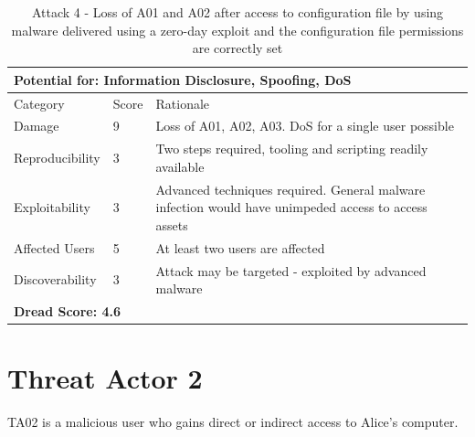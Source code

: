 \documentclass [11pt, proquest] {uwthesis}[2020/02/24]
\begin{document}
\begin{table}[H]
\label{attack4-ref}
\begin{tabular}{|m{3cm}|m{.9cm}|p{27em} |}
\multicolumn{3}{l}{Potential for: Information Disclosure, Spoofing, DoS}                   \\
\hline
Category & Score & Rationale \\
\hline
Damage          & 9     & Loss of A01, A02, A03. DoS for a single user possible            \\
\hline
Reproducibility & 3     & Two steps required, tooling and scripting readily available    \\
\hline
Exploitability & 3      & Advanced techniques required. General malware infection would have unimpeded access to access assets  \\
\hline
Affected Users  & 5     & At least two users are affected                      \\
\hline
Discoverability & 3     & Attack may be targeted - exploited by advanced malware \\
\hline
\multicolumn{3}{l}{\textbf{Dread Score: 4.6}} 
\end{tabular}
\caption{Attack 4 - Loss of A01 and A02 after access to configuration file by using malware delivered using a zero-day exploit and the configuration file permissions are correctly set}
\end{table}

\section{Threat Actor 2}
TA02 is a malicious user who gains direct or indirect access to Alice's computer.  
\end{document}
